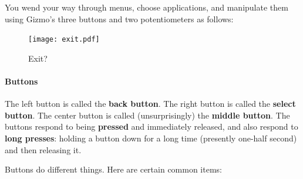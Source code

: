 \documentclass{article}
\begin{document}
You wend your way through menus, choose applications, and manipulate them using Gizmo's three buttons and two potentiometers as follows:

\begin{figure}
\vspace{-1em}
\texttt{[image: exit.pdf]}
\caption{Exit?}
\label{exit}
\vspace{-1em}
\end{figure}

\paragraph{Buttons}  The left button is called the {\bf back button}.  The right button is called the {\bf select button}.  The center button is called (unsurprisingly) the {\bf middle button}.   The buttons respond to being {\bf pressed} and immediately released, and also respond to {\bf long presses}: holding a button down for a long time (presently one-half second) and then releasing it. 

Buttons do different things.  Here are certain common items:
\end{document}
